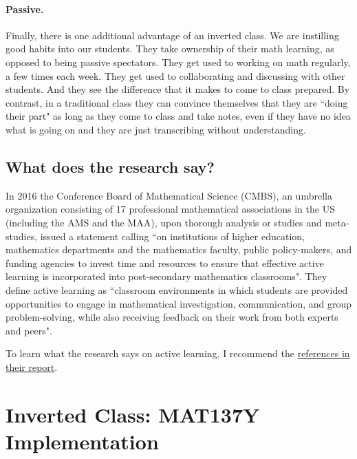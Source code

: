 \documentclass[11pt]{article}
\begin{document}
	\paragraph{Passive.}
	Finally, there is one additional advantage of an inverted class. We are instilling
	good habits into our students. They take ownership of their math learning, as opposed
	to being passive spectators. They get used to working on math regularly, a few
	times each week. They get used to collaborating and discussing with other
	students. And they see the difference that it makes to come to class prepared.
	By contrast, in a traditional class they can convince themselves that they are
	``doing their part" as long as they come to class and take notes, even if they
	have no idea what is going on and they are just transcribing without understanding.

	\subsection{What does the research say?}
	{\baselineskip In 2016 the Conference Board of Mathematical Science (CMBS), an umbrella organization consisting of 17 professional mathematical associations in the US (including the AMS and the MAA), upon thorough analysis or studies and meta-studies, issued a statement calling {``on institutions of higher education, mathematics departments and the mathematics faculty, public policy-makers, and funding agencies to invest time and resources to ensure that effective active learning is incorporated into post-secondary mathematics classrooms"}. They define active learning as ``classroom environments in which students are provided opportunities to engage in mathematical investigation, communication, and group problem-solving, while also receiving feedback on their work from both experts and peers".

	To learn what the research says on active learning, I recommend the \href{https://www.cbmsweb.org/2016/07/active-learning-in-post-secondary-mathematics-education/}{references in their report}. }


	\newpage

	\section[2. Inverted Class: MAT137Y Implementation]{Inverted Class: MAT137Y Implementation}
\end{document}
